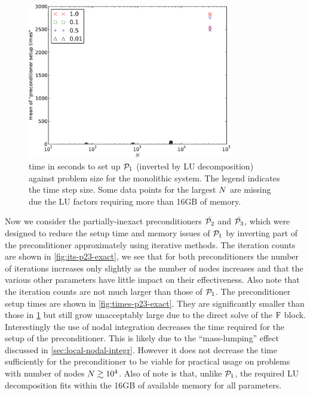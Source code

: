 \begin{figure}
  \centering
  \includegraphics[width=0.8\textwidth]{plots/linear_solvers/som-main-exactimplicitdummy-meanofpreconditionersetuptimesvsinitialnnode.pdf}
  \caption{
    \newtonmean{}
    time in seconds to set up $\mathcal{P}_1$ (inverted by LU decomposition) against problem size for the monolithic system.
    The legend indicates the time step size.
    \manydatapointsTimeStepLegend{}
    Some data points for the largest $N$ are missing due the LU factors requiring more than 16GB of memory.
}
  \label{fig:times-p1-exact}
\end{figure}


Now we consider the partially-inexact preconditioners $\bar{\mathcal{P}_2}$ and $\bar{\mathcal{P}_3}$, which were designed to reduce the setup time and memory issues of $\mathcal{P}_1$ by inverting part of the preconditioner approximately using iterative methods.
The iteration counts are shown in \cref{fig:its-p23-exact}, we see that for both preconditioners the number of iterations increases only slightly as the number of nodes increases and that the various other parameters have little impact on their effectiveness.
Also note that the iteration counts are not much larger than those of $\mathcal{P}_1$.
The preconditioner setup times are shown in \cref{fig:times-p23-exact}.
They are significantly smaller than those in \cref{fig:times-p1-exact} but still grow unacceptably large due to the direct solve of the $\mathrm{F}$ block.
Interestingly the use of nodal integration decreases the time required for the setup of the preconditioner.
This is likely due to the ``mass-lumping'' effect discussed in \cref{sec:local-nodal-integr}.
However it does not decrease the time sufficiently for the preconditioner to be viable for practical usage on problems with number of nodes $N \gtrsim 10^4$.
Also of note is that, unlike $\mathcal{P}_1$, the required LU decomposition fits within the 16GB of available memory for all parameters.

